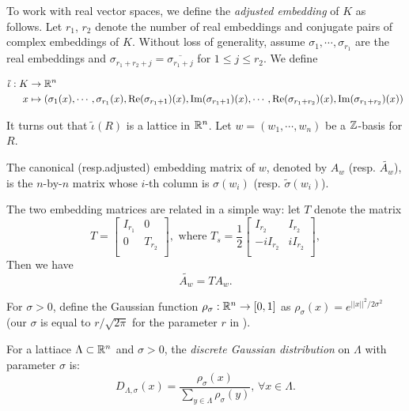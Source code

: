\documentclass{amsart}
\begin{document}
To work with real vector spaces, we define the {\it adjusted embedding} of $K$ as follows. Let $r_1$, $r_2$ denote the number of real embeddings and conjugate pairs of complex embeddings of $K$. Without loss of generality, assume $\sigma_1, \cdots, \sigma_{r_1}$ are the real embeddings and $\sigma_{r_1+r_2+j} = \overline{\sigma_{r_1 + j}}$ for $1 \leq j \leq r_2$. We define

\begin{align*}
    \tilde{\iota}: K & \to \mathbb{R}^n \\
    x & \mapsto (\sigma_1(x), \cdots, \sigma_{r_1}(x), \Re(\sigma_{r_1+1})(x), \Im(\sigma_{r_1+1})(x), \cdots,  \Re(\sigma_{r_1+r_2})(x), \Im(\sigma_{r_1+r_2})(x))
\end{align*}

It turns out that $\tilde{\iota}(R)$ is a lattice in $\mathbb{R}^n$. Let $w = (w_1, \cdots , w_n)$ be a $\mathbb{Z}$-basis for $R$.

\begin{Definition}
The canonical (resp.adjusted) embedding matrix of $w$, denoted by $A_w$ (resp. $\tilde{A_w}$), is the $n$-by-$n$ matrix whose $i$-th column is $\sigma(w_i)$ (resp. $\tilde{\sigma}(w_i)$).
\end{Definition}

The two embedding matrices are related in a simple way:
let $T$ denote the matrix
\[
T = \begin{bmatrix}
    I_{r_1}  & 0  \\
    0     & T_{r_2} \\
\end{bmatrix},
\mbox{ where } T_s = \frac{1}{2} \begin{bmatrix}
    I_{r_2}  & I_{r_2} \\
    -iI_{r_2}     & iI_{r_2} \\
\end{bmatrix},
\]
Then we have
$$\tilde{A_{w}} = T A_{w}.$$


For $\sigma > 0$, define the Gaussian function $\rho_\sigma: \mathbb{R}^n \to [0,1]$ as $\rho_\sigma(x) = e^{||x||^2/2\sigma^2}$ (our $\sigma$ is equal to $r/\sqrt{2\pi}$ for the parameter $r$ in \cite{lyubashevsky2013ideal}).
\begin{Definition}
For a lattiace $\Lambda \subset \mathbb{R}^n$ and $\sigma > 0$, the {\it discrete Gaussian distribution} on $\Lambda$ with parameter $\sigma$ is:
\[
    D_{\Lambda, \sigma}(x) = \frac{\rho_\sigma(x)}{\sum_{y \in\Lambda} \rho_\sigma(y)}, \, \forall x \in \Lambda.
\]

\end{Definition}
\end{document}
